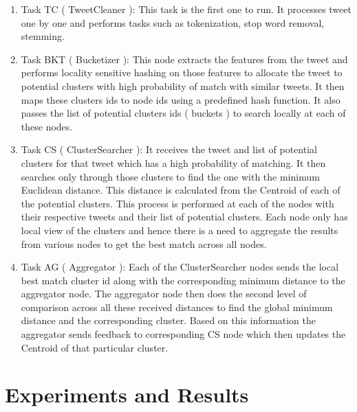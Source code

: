\documentclass{article} %
\begin{document}
\begin{enumerate}
\item Task TC ( TweetCleaner ): This task is the first one to run. It processes tweet one by one and performs tasks such as tokenization, stop word removal, stemming.
\item Task BKT ( Bucketizer ): This node extracts the features from the tweet and performs locality sensitive hashing on those features to allocate the tweet to potential clusters with high probability of match with similar tweets. It then maps these clusters ids to node ids using a predefined hash function. It also passes the list of potential clusters ids ( buckets ) to search locally at each of these nodes.
\item Task CS ( ClusterSearcher ): It receives the tweet and list of potential clusters for that tweet which has a high probability of matching. It then searches only through those clusters to find the one with the minimum Euclidean distance. This distance is calculated from the Centroid of each of the potential clusters. This process is performed at each of the nodes with their respective tweets and their list of potential clusters. Each node only has local view of the clusters and hence there is a need to aggregate the results from various nodes to get the best match across all nodes.
\item Task AG ( Aggregator ): Each of the ClusterSearcher nodes sends the local best match cluster id along with the corresponding minimum distance to the aggregator node. The aggregator node then does the second level of comparison across all these received distances to find the global minimum distance and the corresponding cluster. Based on this information the aggregator sends feedback to corresponding CS node which then updates the Centroid of that particular cluster.
\end{enumerate}





\section{Experiments and Results}
\label{sec:results}
\end{document}
